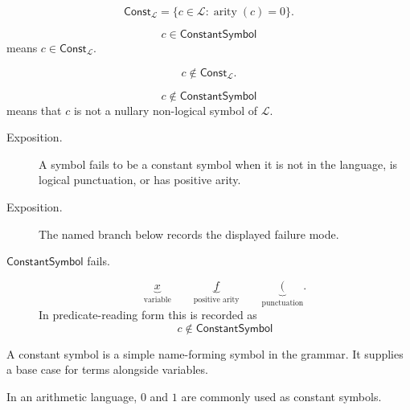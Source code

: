 \begin{remark*}
\[
\mathsf{Const}_{\mathcal L}
=
\{c\in\mathcal L : \operatorname{arity}(c)=0\}.
\]
\end{remark*}

\begin{remark*}
\[
  c\in\mathsf{ConstantSymbol}
\] means
\(c\in\mathsf{Const}_{\mathcal L}\).
\end{remark*}

\begin{remark*}
\[
c\notin\mathsf{Const}_{\mathcal L}.
\]
\end{remark*}

\begin{remark*}
\[
  c\notin\mathsf{ConstantSymbol}
\] means that \(c\) is not a nullary
non-logical symbol of \(\mathcal L\).
\end{remark*}

\begin{remark*}
\begin{description}
  \item[Exposition.] A symbol fails to be a constant symbol when it is not in the language, is
logical punctuation, or has positive arity.
\end{description}
\end{remark*}

\begin{remark*}
\begin{description}
  \item[Exposition.] The named branch below records the displayed failure mode.
\item[\(\mathsf{ConstantSymbol}\) fails.] \[
\underbrace{x}_{\text{variable}}
\qquad
\underbrace{f}_{\text{positive arity}}
\qquad
\underbrace{(}_{\text{punctuation}}.
\]
  In predicate-reading form this is recorded as
  \[
    c\notin\mathsf{ConstantSymbol}
  \]
\end{description}
\end{remark*}

\begin{remark*}[Interpretation]
A constant symbol is a simple name-forming symbol in the grammar. It supplies a
base case for terms alongside variables.
\end{remark*}

\begin{remark*}[Examples]
In an arithmetic language, \(0\) and \(1\) are commonly used as constant
symbols.
\end{remark*}

